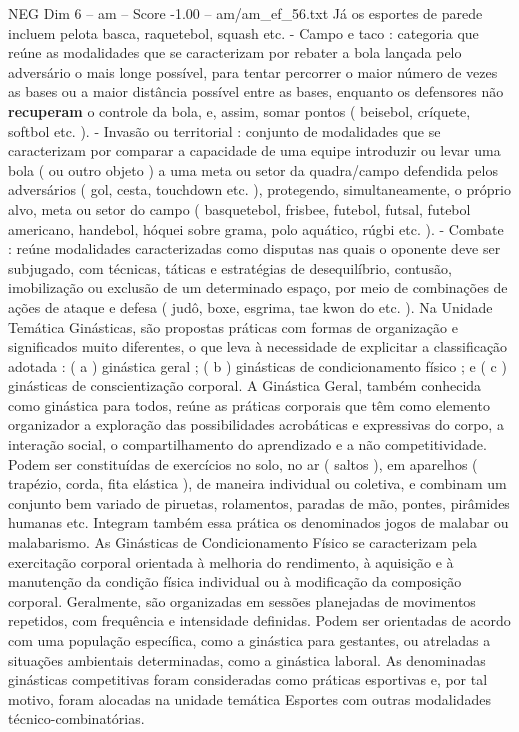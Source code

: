 \begin{textsample}{NEG Dim 6 – am – Score -1.00 – am/am\_ef\_56.txt}
Já os esportes de parede incluem pelota basca, raquetebol, squash etc. - Campo e taco : categoria que reúne as modalidades que se caracterizam por rebater a bola lançada pelo adversário o mais longe possível, para tentar percorrer o maior número de vezes as bases ou a maior distância possível entre as bases, enquanto os defensores não \textbf{recuperam} o controle da bola, e, assim, somar pontos ( beisebol, críquete, softbol etc. ). - Invasão ou territorial : conjunto de modalidades que se caracterizam por comparar a capacidade de uma equipe introduzir ou levar uma bola ( ou outro objeto ) a uma meta ou setor da quadra/campo defendida pelos adversários ( gol, cesta, touchdown etc. ), protegendo, simultaneamente, o próprio alvo, meta ou setor do campo ( basquetebol, frisbee, futebol, futsal, futebol americano, handebol, hóquei sobre grama, polo aquático, rúgbi etc. ). - Combate : reúne modalidades caracterizadas como disputas nas quais o oponente deve ser subjugado, com técnicas, táticas e estratégias de desequilíbrio, contusão, imobilização ou exclusão de um determinado espaço, por meio de combinações de ações de ataque e defesa ( judô, boxe, esgrima, tae kwon do etc. ).
Na Unidade Temática Ginásticas, são propostas práticas com formas de organização e significados muito diferentes, o que leva à necessidade de explicitar a classificação adotada : ( a ) ginástica geral ; ( b ) ginásticas de condicionamento físico ; e ( c ) ginásticas de conscientização corporal.
A Ginástica Geral, também conhecida como ginástica para todos, reúne as práticas corporais que têm como elemento organizador a exploração das possibilidades acrobáticas e expressivas do corpo, a interação social, o compartilhamento do aprendizado e a não competitividade.
Podem ser constituídas de exercícios no solo, no ar ( saltos ), em aparelhos ( trapézio, corda, fita elástica ), de maneira individual ou coletiva, e combinam um conjunto bem variado de piruetas, rolamentos, paradas de mão, pontes, pirâmides humanas etc.
Integram também essa prática os denominados jogos de malabar ou malabarismo.
As Ginásticas de Condicionamento Físico se caracterizam pela exercitação corporal orientada à melhoria do rendimento, à aquisição e à manutenção da condição física individual ou à modificação da composição corporal.
Geralmente, são organizadas em sessões planejadas de movimentos repetidos, com frequência e intensidade definidas.
Podem ser orientadas de acordo com uma população específica, como a ginástica para gestantes, ou atreladas a situações ambientais determinadas, como a ginástica laboral.
As denominadas ginásticas competitivas foram consideradas como práticas esportivas e, por tal motivo, foram alocadas na unidade temática Esportes com outras modalidades técnico-combinatórias.

\end{textsample}
